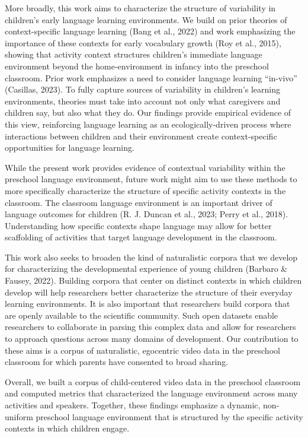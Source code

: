\documentclass[10pt, letterpaper]{article}
\begin{document}
More broadly, this work aims to characterize the structure of
variability in children's early language learning environments. We build
on prior theories of context-specific language learning (Bang et al.,
2022) and work emphasizing the importance of these contexts for early
vocabulary growth (Roy et al., 2015), showing that activity context
structures children's immediate language environment beyond the
home-environment in infancy into the preschool classroom. Prior work
emphasizes a need to consider language learning ``in-vivo'' (Casillas,
2023). To fully capture sources of variability in children's learning
environments, theories must take into account not only what caregivers
and children say, but also what they do. Our findings provide empirical
evidence of this view, reinforcing language learning as an
ecologically-driven process where interactions between children and
their environment create context-specific opportunities for language
learning.

While the present work provides evidence of contextual variability
within the preschool language environment, future work might aim to use
these methods to more specifically characterize the structure of
specific activity contexts in the classroom. The classroom language
environment is an important driver of language outcomes for children (R.
J. Duncan et al., 2023; Perry et al., 2018). Understanding how specific
contexts shape language may allow for better scaffolding of activities
that target language development in the classroom.

This work also seeks to broaden the kind of naturalistic corpora that we
develop for characterizing the developmental experience of young
children (Barbaro \& Fausey, 2022). Building corpora that center on
distinct contexts in which children develop will help researchers better
characterize the structure of their everyday learning environments. It
is also important that researchers build corpora that are openly
available to the scientific community. Such open datasets enable
researchers to collaborate in parsing this complex data and allow for
researchers to approach questions across many domains of development.
Our contribution to these aims is a corpus of naturalistic, egocentric
video data in the preschool classroom for which parents have consented
to broad sharing.

Overall, we built a corpus of child-centered video data in the preschool
classroom and computed metrics that characterized the language
environment across many activities and speakers. Together, these
findings emphasize a dynamic, non-uniform preschool language environment
that is structured by the specific activity contexts in which children
engage.
\end{document}
